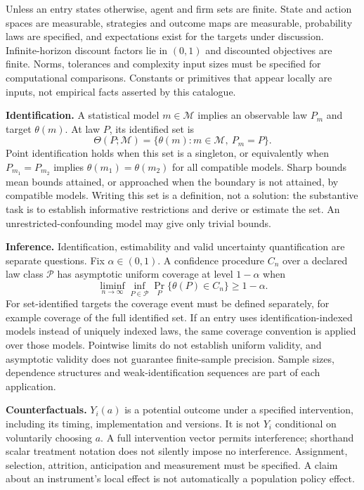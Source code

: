 \documentclass[11pt,a4paper]{article}
\begin{document}
Unless an entry states otherwise, agent and firm sets are finite. State and action spaces are measurable, strategies and outcome maps are measurable, probability laws are specified, and expectations exist for the targets under discussion. Infinite-horizon discount factors lie in $(0,1)$ and discounted objectives are finite. Norms, tolerances and complexity input sizes must be specified for computational comparisons. Constants or primitives that appear locally are inputs, not empirical facts asserted by this catalogue.

\textbf{Identification.} A statistical model $m\in\mathcal M$ implies an observable law $P_m$ and target $\theta(m)$. At law $P$, its identified set is
\[
\Theta(P;\mathcal M)=\{\theta(m):m\in\mathcal M,\ P_m=P\}.
\]
Point identification holds when this set is a singleton, or equivalently when $P_{m_1}=P_{m_2}$ implies $\theta(m_1)=\theta(m_2)$ for all compatible models. Sharp bounds mean bounds attained, or approached when the boundary is not attained, by compatible models. Writing this set is a definition, not a solution: the substantive task is to establish informative restrictions and derive or estimate the set. An unrestricted-confounding model may give only trivial bounds.

\textbf{Inference.} Identification, estimability and valid uncertainty quantification are separate questions. Fix $\alpha\in(0,1)$. A confidence procedure $C_n$ over a declared law class $\mathcal P$ has asymptotic uniform coverage at level $1-\alpha$ when
\[
\liminf_{n\to\infty}\inf_{P\in\mathcal P}\Pr_P\{\theta(P)\in C_n\}\geq1-\alpha.
\]
For set-identified targets the coverage event must be defined separately, for example coverage of the full identified set. If an entry uses identification-indexed models instead of uniquely indexed laws, the same coverage convention is applied over those models. Pointwise limits do not establish uniform validity, and asymptotic validity does not guarantee finite-sample precision. Sample sizes, dependence structures and weak-identification sequences are part of each application.

\textbf{Counterfactuals.} $Y_i(a)$ is a potential outcome under a specified intervention, including its timing, implementation and versions. It is not $Y_i$ conditional on voluntarily choosing $a$. A full intervention vector permits interference; shorthand scalar treatment notation does not silently impose no interference. Assignment, selection, attrition, anticipation and measurement must be specified. A claim about an instrument's local effect is not automatically a population policy effect.
\end{document}
